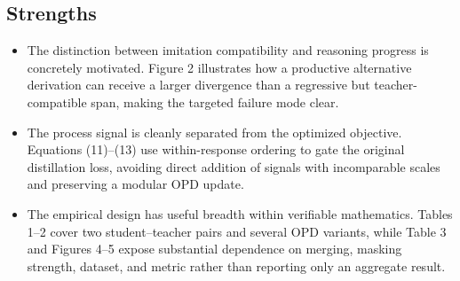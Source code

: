 \documentclass[11pt,a4paper]{article}
\begin{document}
\subsection*{Strengths}
\begin{itemize}
\item The distinction between imitation compatibility and reasoning progress is concretely motivated. Figure 2 illustrates how a productive alternative derivation can receive a larger divergence than a regressive but teacher-compatible span, making the targeted failure mode clear.
\item The process signal is cleanly separated from the optimized objective. Equations (11)--(13) use within-response ordering to gate the original distillation loss, avoiding direct addition of signals with incomparable scales and preserving a modular OPD update.
\item The empirical design has useful breadth within verifiable mathematics. Tables 1--2 cover two student--teacher pairs and several OPD variants, while Table 3 and Figures 4--5 expose substantial dependence on merging, masking strength, dataset, and metric rather than reporting only an aggregate result.
\end{itemize}
\end{document}
